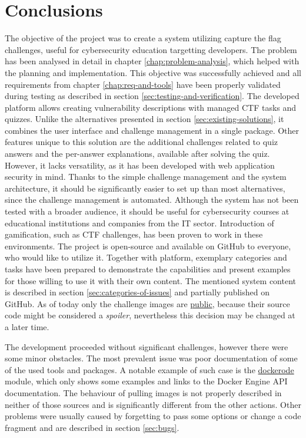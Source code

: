 \chapter{Conclusions}
\label{chap:conclusions}

The objective of the project was to create a system utilizing capture the flag challenges, useful for cybersecurity education targetting developers. The problem has been analysed in detail in chapter \ref{chap:problem-analysis}, which helped with the planning and implementation. This objective was successfully achieved and all requirements from chapter \ref{chap:req-and-tools} have been properly validated during testing as described in section \ref{sec:testing-and-verification}. The developed platform allows creating vulnerability descriptions with managed CTF tasks and quizzes. Unlike the alternatives presented in section \ref{sec:existing-solutions}, it combines the user interface and challenge management in a single package. Other features unique to this solution are the additional challenges related to quiz answers and the per-answer explanations, available after solving the quiz. However, it lacks versatility, as it has been developed with web application security in mind. Thanks to the simple challenge management and the system architecture, it should be significantly easier to set up than most alternatives, since the challenge management is automated.
Although the system has not been tested with a broader audience, it should be useful for cybersecurity courses at educational institutions and companies from the IT sector. Introduction of gamification, such as CTF challenges, has been proven to work in these environments. The project is open-source and available on GitHub to everyone, who would like to utilize it. Together with platform, exemplary categories and tasks have been prepared to demonstrate the capabilities and present examples for those willing to use it with their own content. The mentioned system content is described in section \ref{sec:categories-of-issues} and partially published on GitHub. As of today only the challenge images are \href{https://github.com/krzysdz?ecosystem=container&tab=packages}{public}, because their source code might be considered a \textit{spoiler}, nevertheless this decision may be changed at a later time.

The development proceeded without significant challenges, however there were some minor obstacles. The most prevalent issue was poor documentation of some of the used tools and packages. A notable example of such case is the \href{https://github.com/apocas/dockerode}{dockerode} module, which only shows some examples and links to the Docker Engine API documentation. The behaviour of pulling images is not properly described in neither of those sources and is significantly different from the other actions. Other problems were usually caused by forgetting to pass some options or change a code fragment and are described in section \ref{sec:bugs}.

